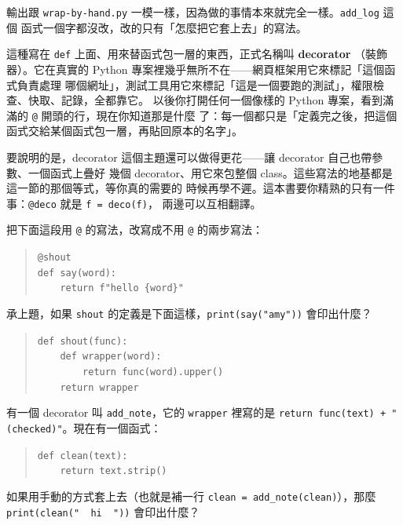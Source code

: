 
輸出跟 \texttt{wrap-by-hand.py} 一模一樣，因為做的事情本來就完全一樣。\texttt{add\_log} 這個
函式一個字都沒改，改的只有「怎麼把它套上去」的寫法。

這種寫在 \texttt{def} 上面、用來替函式包一層的東西，正式名稱叫 \textbf{decorator}
（裝飾器）。它在真實的 Python 專案裡幾乎無所不在——網頁框架用它來標記「這個函式負責處理
哪個網址」，測試工具用它來標記「這是一個要跑的測試」，權限檢查、快取、記錄，全都靠它。
以後你打開任何一個像樣的 Python 專案，看到滿滿的 \texttt{@} 開頭的行，現在你知道那是什麼
了：每一個都只是「定義完之後，把這個函式交給某個函式包一層，再貼回原本的名字」。


要說明的是，decorator 這個主題還可以做得更花——讓 decorator 自己也帶參數、一個函式上疊好
幾個 decorator、用它來包整個 class。這些寫法的地基都是這一節的那個等式，等你真的需要的
時候再學不遲。這本書要你精熟的只有一件事：\texttt{@deco} 就是 \texttt{f = deco(f)}，
兩邊可以互相翻譯。

\begin{drills}[label=drills:decorator]
\item 把下面這段用 \texttt{@} 的寫法，改寫成不用 \texttt{@} 的兩步寫法：
\begin{quote}
\texttt{@shout} \\
\texttt{def say(word):} \\
\texttt{~~~~return f"hello \{word\}"}
\end{quote}
\item 承上題，如果 \texttt{shout} 的定義是下面這樣，\texttt{print(say("amy"))} 會印出什麼？
\begin{quote}
\texttt{def shout(func):} \\
\texttt{~~~~def wrapper(word):} \\
\texttt{~~~~~~~~return func(word).upper()} \\
\texttt{~~~~return wrapper}
\end{quote}
\item 有一個 decorator 叫 \texttt{add\_note}，它的 \texttt{wrapper} 裡寫的是
\texttt{return func(text) + " (checked)"}。現在有一個函式：
\begin{quote}
\texttt{def clean(text):} \\
\texttt{~~~~return text.strip()}
\end{quote}
如果用手動的方式套上去（也就是補一行 \texttt{clean = add\_note(clean)}），那麼
\texttt{print(clean("~~hi~~"))} 會印出什麼？
\end{drills}

